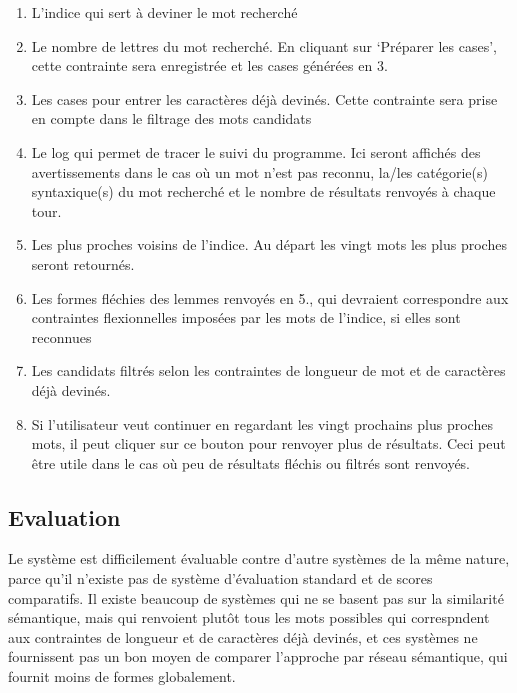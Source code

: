 {\begin{enumerate}
    \item{L'indice qui sert à deviner le mot recherché}
    \item{Le nombre de lettres du mot recherché. En cliquant sur \lq{Préparer les cases}\rq, cette contrainte sera enregistrée et les cases générées en 3.}
    \item{Les cases pour entrer les caractères déjà devinés. Cette contrainte sera prise en compte dans le filtrage des mots candidats}
    \item{Le log qui permet de tracer le suivi du programme. Ici seront affichés des avertissements dans le cas où un mot n'est pas reconnu, la/les catégorie(s) syntaxique(s) du mot recherché et le nombre de résultats renvoyés à chaque tour.}
    \item{Les plus proches voisins de l'indice. Au départ les vingt mots les plus proches seront retournés.}
    \item{Les formes fléchies des lemmes renvoyés en 5., qui devraient correspondre aux contraintes flexionnelles imposées par les mots de l'indice, si elles sont reconnues}
    \item{Les candidats filtrés selon les contraintes de longueur de mot et de caractères déjà devinés.}
    \item{Si l'utilisateur veut continuer en regardant les vingt prochains plus proches mots, il peut cliquer sur ce bouton pour renvoyer plus de résultats. Ceci peut être utile dans le cas où peu de résultats fléchis ou filtrés sont renvoyés.}
    
\end{enumerate}


\subsection{Evaluation}
Le système est difficilement évaluable contre d'autre systèmes de la même nature, parce qu'il n'existe pas de système d'évaluation standard et de scores comparatifs. Il existe beaucoup de systèmes qui ne se basent pas sur la similarité sémantique, mais qui renvoient plutôt tous les mots possibles qui correspndent aux contraintes de longueur et de caractères déjà devinés, et ces systèmes ne fournissent pas un bon moyen de comparer l'approche par réseau sémantique, qui fournit moins de formes globalement.

}
